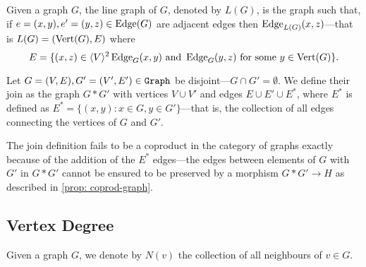\begin{definition}\label{def: line-graph}
    Given a graph \(G\), the line graph of \(G\), denoted by \(L(G)\), is the
    graph such that, if \(e = (x, y), e' = (y, z) \in \operatorname{Edge}(G)\) are adjacent edges
    then \(\operatorname{Edge}_{L(G)}(x, z)\)---that is \(L(G) = (\operatorname{Vert}(G), E)\) where
    \[
        E = \{(x, z) \in \langle V \rangle^2 \relax \operatorname{Edge}_G(x, y) \text{ and } \operatorname{Edge}_G(y, z)
        \text{ for some } y \in \operatorname{Vert}(G)\}.
    \]
\end{definition}

\begin{definition}[Join]\label{def: graph-join}
    Let \(G = (V, E), G' = (V', E') \in {\texttt{Graph}}\) be disjoint---\(G \cap G' =
    \emptyset\). We define their join as the graph \(G * G'\) with vertices \(V
    \cup V'\) and edges \(E \cup E' \cup E^*\), where \(E^*\) is defined as \(E^*
    = \{(x, y) \colon x \in G, y \in G'\}\)---that is, the collection of all edges
    connecting the vertices of \(G\) and \(G'\).
\end{definition}

The join definition fails to be a coproduct in the category of graphs exactly
because of the addition of the \(E^*\) edges---the edges between elements of
\(G\) with \(G'\) in \({G * G'}\) cannot be ensured to be preserved by a morphism
\(G * G' \to H\) as described in \cref{prop: coprod-graph}.

\subsection{Vertex Degree}

\begin{notation}[Neighbourhood]
    Given a graph \(G\), we denote by \(N(v)\) the collection of all neighbours of
    \(v \in G\).
\end{notation}

